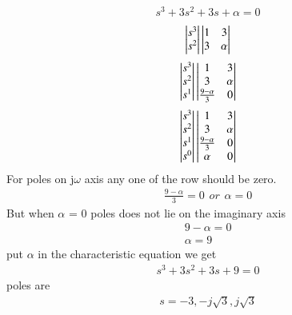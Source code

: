 \begin{enumerate}[label=\thesection.\arabic*.,ref=\thesection.\theenumi]
\begin{align}
 s^3+3s^2+3s+\alpha = 0
\end{align}
%
\begin{align}
\mydet{s^3\\s^2}
\mydet{1 & 3 \\ 3 & \alpha }
\label{eq:sec_order_op_1}
\end{align}
\begin{align}
\mydet{s^3\\s^2\\s^1}
\mydet{1 & 3 \\ 3 & \alpha \\  \frac{9-\alpha}{3} & 0} \label{eq:sec_order_op_1}
\end{align}
\begin{align}
\mydet{s^3\\s^2\\s^1\\s^0}
\mydet{1 & 3 \\ 3 & \alpha \\  \frac{9-\alpha}{3} & 0\\ \alpha & 0} \label{eq:sec_order_op_1}
\end{align}
For poles on j$\omega$ axis any one of the row should be zero.
\begin{align}
\frac{9-\alpha}{3} = 0 \hspace{5pt} or\hspace{5pt} \alpha = 0
\end{align}
But when $\alpha$ = 0 poles does not lie on the imaginary axis
\begin{align}
   9-\alpha = 0\\
   \alpha = 9
\end{align}
put $\alpha$ in the characteristic equation we get
\begin{align}
s^3+3s^2+3s+9=0
\end{align}
poles are 
\begin{align}
s = -3,-j\sqrt{3} ,j\sqrt{3}
\end{align}
\end{enumerate}